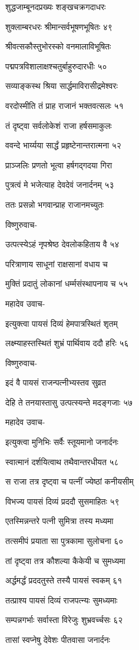 शुद्धजाम्बूनदप्रख्यः शङ्खचक्रगदाधरः

शुक्लाम्बरधरः श्रीमान्सर्वभूषणभूषितः ४९

श्रीवत्सकौस्तुभोरस्को वनमालाविभूषितः

पद्मपत्रविशालाक्षश्चतुर्बाहुरुदारधीः ५०

सव्याङ्कस्थ श्रिया सार्द्धमाविरासीद्रमेश्वरः

वरदोस्मीति तं प्राह राजानं भक्तवत्सलः ५१

तं दृष्ट्वा सर्वलोकेशं राजा हर्षसमाकुलः

ववन्दे भार्य्यया सार्द्धं प्रहृष्टेनान्तरात्मना ५२

प्राञ्जलिः प्रणतो भूत्वा हर्षगद्गदया गिरा

पुत्रत्वं मे भजेत्याह देवदेवं जनार्दनम् ५३

ततः प्रसन्नो भगवान्प्राह राजानमच्युतः

विष्णुरुवाच-

उत्पत्स्येऽहं नृपश्रेष्ठ देवलोकहिताय वै ५४

परित्राणाय साधूनां राक्षसानां वधाय च

मुक्तिं प्रदातुं लोकानां धर्म्मसंस्थापनाय च ५५

महादेव उवाच-

इत्युक्त्वा पायसं दिव्यं हेमपात्रस्थितं शृतम्

लक्ष्म्याहस्तस्थितं शुभ्रं पार्थिवाय ददौ हरिः ५६

विष्णुरुवाच-

इदं वै पायसं राजन्पत्नीभ्यस्तव सुव्रत

देहि ते तनयास्तासु उत्पत्स्यन्ते मदङ्गजाः ५७

महादेव उवाच-

इत्युक्त्वा मुनिभिः सर्वैः स्तूयमानो जनार्दनः

स्वात्मानं दर्शयित्वाथ तथैवान्तरधीयत ५८

स राजा तत्र दृष्ट्वा च पत्नीं ज्येष्ठां कनीयसीम्

विभज्य पायसं दिव्यं प्रददौ सुसमाहितः ५९

एतस्मिन्नन्तरे पत्नी सुमित्रा तस्य मध्यमा

तत्समीपं प्रयाता सा पुत्रकामा सुलोचना ६०

तां दृष्ट्वा तत्र कौशल्या कैकेयी च सुमध्यमा

अर्द्धमर्द्धं प्रददतुस्ते तस्यै पायसं स्वकम् ६१

तत्प्राश्य पायसं दिव्यं राजपत्न्यः सुमध्यमाः

सम्पन्नगर्भाः सर्वास्ता विरेजुः शुभ्रवर्च्चसः ६२

तासां स्वप्नेषु देवेशः पीतवासा जनार्दनः

